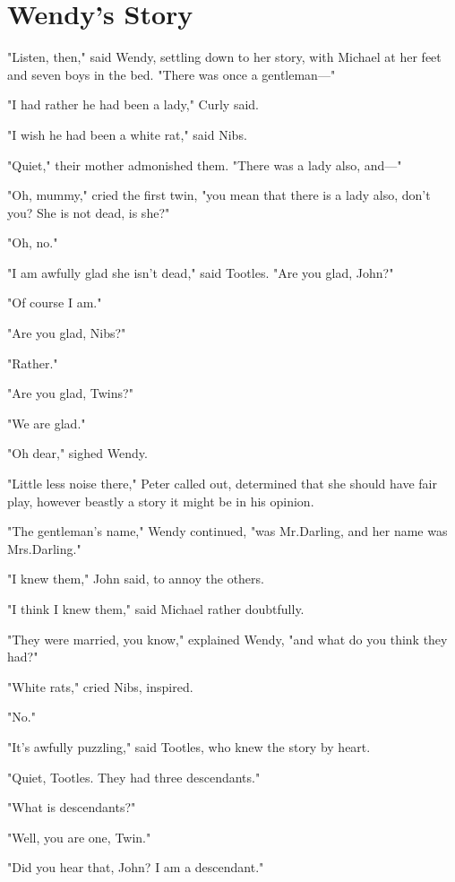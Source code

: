 
\chapter{Wendy’s Story}

"Listen, then," said Wendy, settling down to her story,
with Michael at her feet and seven boys in the bed.
"There was once a gentleman—"

"I had rather he had been a lady," Curly said.

"I wish he had been a white rat," said Nibs.

"Quiet," their mother admonished them.
"There was a lady also, and—"

"Oh, mummy," cried the first twin,
"you mean that there is a lady also, don't you?
She is not dead, is she?"

"Oh, no."

"I am awfully glad she isn't dead," said Tootles.
"Are you glad, John?"

"Of course I am."

"Are you glad, Nibs?"

"Rather."

"Are you glad, Twins?"

"We are glad."

"Oh dear," sighed Wendy.

"Little less noise there," Peter called out,
determined that she should have fair play,
however beastly a story it might be in his opinion.

"The gentleman's name," Wendy continued, "was Mr.\@ Darling, and her name was Mrs.\@ Darling."

"I knew them," John said, to annoy the others.

"I think I knew them," said Michael rather doubtfully.

"They were married, you know," explained Wendy,
"and what do you think they had?"

"White rats," cried Nibs, inspired.

"No."

"It's awfully puzzling," said Tootles,
who knew the story by heart.

"Quiet, Tootles.
They had three descendants."

"What is descendants?"

"Well, you are one, Twin."

"Did you hear that, John?
I am a descendant."

